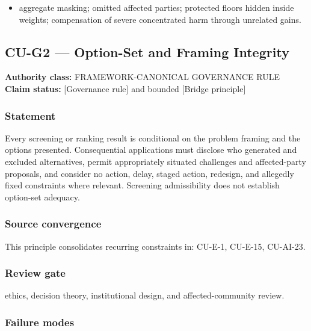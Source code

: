 \documentclass[
  11pt,
]{article}
\providecommand{\tightlist}{%
  \setlength{\itemsep}{0pt}\setlength{\parskip}{0pt}}
\begin{document}
\begin{itemize}
\tightlist
\item
  aggregate masking; omitted affected parties; protected floors hidden
  inside weights; compensation of severe concentrated harm through
  unrelated gains.
\end{itemize}

\subsection{CU-G2 --- Option-Set and Framing
Integrity}\label{cu-g2-option-set-and-framing-integrity}

\textbf{Authority class:} FRAMEWORK-CANONICAL GOVERNANCE RULE\\
\textbf{Claim status:} {[}Governance rule{]} and bounded {[}Bridge
principle{]}

\subsubsection{Statement}\label{statement-52}

Every screening or ranking result is conditional on the problem framing
and the options presented. Consequential applications must disclose who
generated and excluded alternatives, permit appropriately situated
challenges and affected-party proposals, and consider no action, delay,
staged action, redesign, and allegedly fixed constraints where relevant.
Screening admissibility does not establish option-set adequacy.

\subsubsection{Source convergence}\label{source-convergence-1}

This principle consolidates recurring constraints in: CU-E-1, CU-E-15,
CU-AI-23.

\subsubsection{Review gate}\label{review-gate-8}

ethics, decision theory, institutional design, and affected-community
review.

\subsubsection{Failure modes}\label{failure-modes-25}
\end{document}
